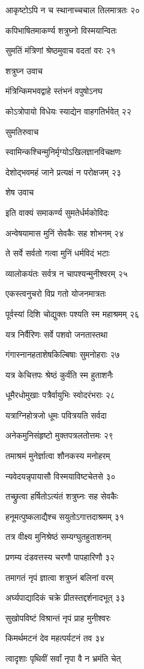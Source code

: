 आकृष्टोऽपि न च स्थानाच्चचाल तिलमात्रतः २०

कपिभाषितमाकर्ण्य शत्रुघ्नो विस्मयान्वितः

सुमतिं मंत्रिणां श्रेष्ठमुवाच वदतां वरः २१

शत्रुघ्न उवाच

मंत्रिन्किमभवद्वाहे स्तंभनं वपुषोऽनघ

कोऽत्रोपायो विधेयः स्याद्येन वाहगतिर्भवेत् २२

सुमतिरुवाच

स्वामिन्कश्चिन्मुनिर्मृग्योऽखिलज्ञानविचक्षणः

देशोद्भवमहं जाने प्रत्यक्षं न परोक्षजम् २३

शेष उवाच

इति वाक्यं समाकर्ण्य सुमतेर्धर्मकोविदः

अन्वेषयामास मुनिं सेवकैः सह शोभनम् २४

ते सर्वे सर्वतो गत्वा मुनिं धर्मविदं भटाः

व्यालोकयंतः सर्वत्र न चापश्यन्मुनीश्वरम् २५

एकस्त्वनुचरो विप्र गतो योजनमात्रतः

पूर्वस्यां दिशि चोद्युक्तः पश्यति स्म महाश्रमम् २६

यत्र निर्वैरिणः सर्वे पशवो जनतास्तथा

गंगास्नानहताशेषकिल्बिषाः सुमनोहराः २७

यत्र केचित्तपः श्रेष्ठं कुर्वंति स्म हुताशनैः

धूमैरधोमुखाः पत्रैर्वायुभिः स्वोदरंभराः २८

यत्राग्निहोत्रजो धूमः पवित्रयति सर्वदा

अनेकमुनिसंहृष्टो मुक्तपत्रलतोत्तमः २९

तमाश्रमं मुनेर्ज्ञात्वा शौनकस्य मनोहरम्

न्यवेदयन्नृपायासौ विस्मयाविष्टचेतसे ३०

तच्छ्रुत्वा हर्षितोऽत्यंतं शत्रुघ्नः सह सेवकैः

हनूमत्पुष्कलाद्यैश्च सयुतोऽगात्तदाश्रमम् ३१

तत्र वीक्ष्य मुनिश्रेष्ठं सम्यग्घुतहुताशनम्

प्रणम्य दंडवत्तस्य चरणौ पापहारिणौ ३२

तमागतं नृपं ज्ञात्वा शत्रुघ्नं बलिनां वरम्

अर्घ्यपाद्यादिकं चक्रे प्रीतस्तद्दर्शनादभूत् ३३

सुखोपविष्टं विश्रान्तं नृपं प्राह मुनीश्वरः

किमर्थमटनं देव महत्पर्यटनं तव ३४

त्वादृशाः पृथिवीं सर्वां नृपा वै न भ्रमंति चेत्

